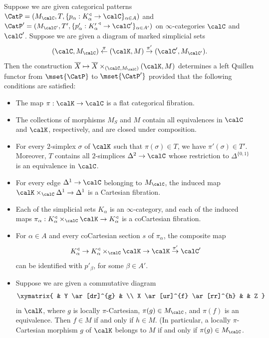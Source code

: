 \begin{theorem}\label{makera}
Suppose we are given categorical patterns
$\CatP = (M_{\calC}, T, \{ p_{\alpha}: K_{\alpha}^{\triangleleft} \rightarrow \calC\}_{\alpha \in A})$ and
$\CatP' = (M_{\calC'}, T', \{ p'_{\alpha}: {K'_{\alpha}}^{\triangleleft} \rightarrow \calC'\}_{\alpha \in A'})$ on $\infty$-categories $\calC$ and $\calC'$. Suppose we are given a diagram of marked simplicial sets
$$ (\calC, M_{\calC}) \stackrel{\pi}{\leftarrow} (\calK, M) \stackrel{\pi'}{\rightarrow} (\calC', M_{\calC'}).$$
Then the construction $\overline{X} \mapsto \overline{X} \times_{ (\calC, M_{\calC}) } (\calK,M)$
determines a left Quillen functor from $\mset{\CatP}$ to $\mset{\CatP'}$ provided that the following
conditions are satisfied:
\begin{itemize}
\item[$(1)$] The map $\pi: \calK \rightarrow \calC$ is a flat categorical fibration.

\item[$(2)$] The collections of morphisms $M_{S}$ and $M$ contain all equivalences
in $\calC$ and $\calK$, respectively, and are closed under composition.

\item[$(3)$] For every $2$-simplex $\sigma$ of $\calK$ such that $\pi(\sigma) \in T$, we have
$\pi'(\sigma) \in T'$. Moreover, $T$ contains all $2$-simplices $\Delta^2 \rightarrow \calC$
whose restriction to $\Delta^{ \{0,1\} }$ is an equivalence in $\calC$.

\item[$(4)$] For every edge $\Delta^1 \rightarrow \calC$ belonging to $M_{\calC}$, the
induced map $\calK \times_{ \calC} \Delta^1 \rightarrow \Delta^1$ is a Cartesian fibration.

\item[$(5)$] Each of the simplicial sets $K_{\alpha}$ is an $\infty$-category, and each of the
induced maps $\pi_{\alpha}: K_{\alpha}^{\triangleleft} \times_{\calC} \calK \rightarrow K_{\alpha}^{\triangleleft}$ is a coCartesian fibration.

\item[$(6)$] For $\alpha \in A$ and every coCartesian section $s$ of $\pi_{\alpha}$, the composite map
$$ K_{\alpha}^{\triangleleft} \rightarrow K_{\alpha}^{\triangleleft} \times_{\calC} \calK
\rightarrow \calK \stackrel{\pi'}{\rightarrow} \calC'$$
can be identified with $p'_{\beta}$, for some $\beta \in A'$.

\item[$(7)$] Suppose we are given a commutative diagram
$$\xymatrix{ & Y \ar[dr]^{g} & \\
X \ar[ur]^{f} \ar[rr]^{h} & & Z }$$
in $\calK$, where $g$ is locally $\pi$-Cartesian, $\pi(g) \in M_{\calC}$, and $\pi(f)$ is an equivalence.
Then $f \in M$ if and only if $h \in M$. (In particular, a locally $\pi$-Cartesian morphism
$g$ of $\calK$ belongs to $M$ if and only if $\pi(g) \in M_{\calC}$.


\end{itemize}
\end{theorem}
